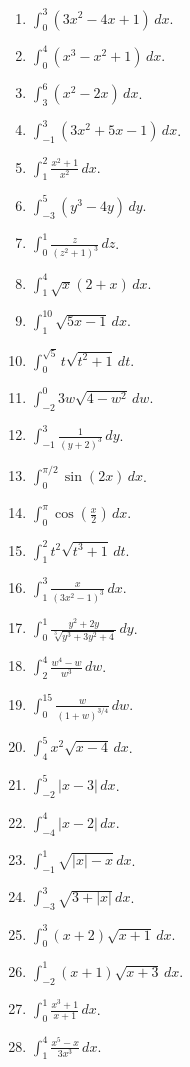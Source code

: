 \documentclass[12pt]{article}
\begin{document}
\begin{enumerate}
\item $\displaystyle \int_0^3(3x^2-4x+1)\,dx$.
\item $\displaystyle \int_0^4(x^3-x^2+1)\,dx$.
\item $\displaystyle \int_3^6(x^2-2x)\,dx$.
\item $\displaystyle \int_{-1}^3(3x^2+5x-1)\,dx$.
\item $\displaystyle \int_1^2\frac{x^2+1}{x^2}\,dx$.
\item $\displaystyle \int_{-3}^{5}(y^3-4y)\,dy$.
\item $\displaystyle \int_0^1\frac{z}{(z^2+1)^3}\,dz$.
\item $\displaystyle \int_1^4\sqrt{x}(2+x)\,dx$.
\item $\displaystyle \int_1^{10}\sqrt{5x-1}\,dx$.
\item $\displaystyle \int_0^{\sqrt5}t\sqrt{t^2+1}\,dt$.
\item $\displaystyle \int_{-2}^{0}3w\sqrt{4-w^2}\,dw$.
\item $\displaystyle \int_{-1}^{3}\frac1{(y+2)^3}\,dy$.
\item $\displaystyle \int_0^{\pi/2}\sin(2x)\,dx$.
\item $\displaystyle \int_0^\pi\cos\left(\frac{x}{2}\right)\,dx$.
\item $\displaystyle \int_1^2t^2\sqrt{t^3+1}\,dt$.
\item $\displaystyle \int_1^3\frac{x}{(3x^2-1)^3}\,dx$.
\item $\displaystyle \int_0^1\frac{y^2+2y}{\sqrt[3]{y^3+3y^2+4}}\,dy$.
\item $\displaystyle \int_2^4\frac{w^4-w}{w^3}\,dw$.
\item $\displaystyle \int_0^{15}\frac{w}{(1+w)^{3/4}}\,dw$.
\item $\displaystyle \int_4^5x^2\sqrt{x-4}\,dx$.
\item $\displaystyle \int_{-2}^5|x-3|\,dx$.
\item $\displaystyle \int_{-4}^4|x-2|\,dx$.
\item $\displaystyle \int_{-1}^{1}\sqrt{|x|-x}\,dx$.
\item $\displaystyle \int_{-3}^{3}\sqrt{3+|x|}\,dx$.
\item $\displaystyle \int_0^3(x+2)\sqrt{x+1}\,dx$.
\item $\displaystyle \int_{-2}^{1}(x+1)\sqrt{x+3}\,dx$.
\item $\displaystyle \int_0^1\frac{x^3+1}{x+1}\,dx$.
\item $\displaystyle \int_1^4\frac{x^5-x}{3x^3}\,dx$.

\end{enumerate}
\end{document}
